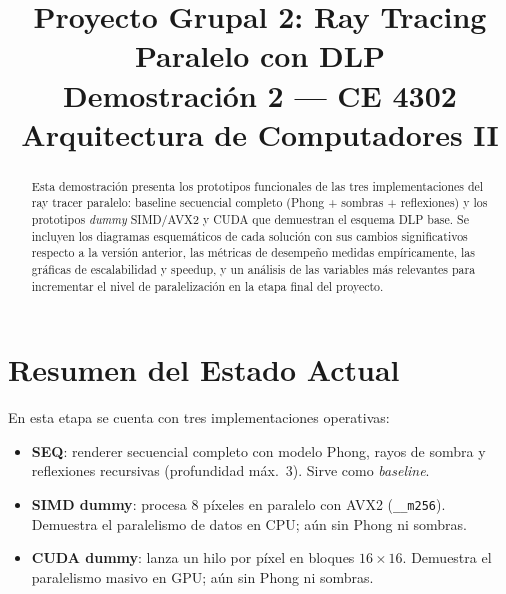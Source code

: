\documentclass[conference]{IEEEtran}
\begin{document}
\title{\textbf{Proyecto Grupal 2: Ray Tracing Paralelo con DLP}\\
{\large Demostración 2 — CE 4302 Arquitectura de Computadores II}}

\author{
  \and
  \and
}

\maketitle

\begin{abstract}
Esta demostración presenta los prototipos funcionales de las tres implementaciones del
ray tracer paralelo: baseline secuencial completo (Phong + sombras + reflexiones) y los
prototipos \textit{dummy} SIMD/AVX2 y CUDA que demuestran el esquema DLP base.
Se incluyen los diagramas esquemáticos de cada solución con sus cambios significativos
respecto a la versión anterior, las métricas de desempeño medidas empíricamente,
las gráficas de escalabilidad y speedup, y un análisis de las variables más relevantes
para incrementar el nivel de paralelización en la etapa final del proyecto.
\end{abstract}

\section{Resumen del Estado Actual}

En esta etapa se cuenta con tres implementaciones operativas:
\begin{itemize}
  \item \textbf{SEQ}: renderer secuencial completo con modelo Phong, rayos de sombra y
        reflexiones recursivas (profundidad máx.\ 3). Sirve como \textit{baseline}.
  \item \textbf{SIMD dummy}: procesa 8 píxeles en paralelo con AVX2 (\texttt{\_\_m256}).
        Demuestra el paralelismo de datos en CPU; aún sin Phong ni sombras.
  \item \textbf{CUDA dummy}: lanza un hilo por píxel en bloques $16\!\times\!16$.
        Demuestra el paralelismo masivo en GPU; aún sin Phong ni sombras.
\end{itemize}
\end{document}

